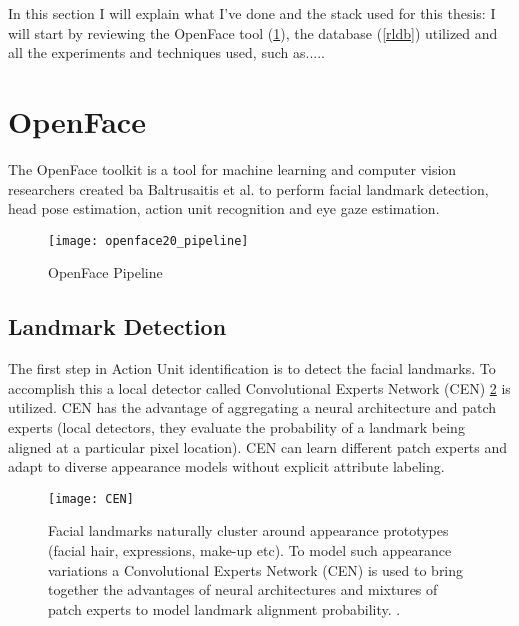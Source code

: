 In this section I will explain what I've done and the stack used for this thesis: I will start by reviewing the OpenFace tool (\ref{OpenFace}), the database (\ref{rldb}) utilized and all the experiments and techniques used, such as.....


\section{OpenFace} \label{OpenFace}
The OpenFace \cite{Baltru2018} toolkit is a tool for machine learning and computer vision researchers created ba Baltrusaitis et al. to perform facial landmark detection, head pose estimation, action unit recognition and eye gaze estimation. \\

\begin{figure}[H]
	\centering
	\texttt{[image: openface20\_pipeline]}
	\caption{OpenFace Pipeline \cite{Baltru2018}}
	\label{fig:openface20_pipeline}
\end{figure}

\subsection{Landmark Detection}
The first step in Action Unit identification is to detect the facial landmarks. To accomplish this a local detector called Convolutional Experts Network (CEN) \ref{fig:CEN} is utilized. CEN has the advantage of aggregating a neural architecture and patch experts (local detectors, they evaluate the probability of a landmark being aligned at a particular pixel location). CEN can learn different patch experts and adapt to diverse appearance models without explicit attribute labeling. \\

\begin{figure}[H]
	\centering
	\texttt{[image: CEN]}
	\caption{Facial landmarks naturally cluster around appearance prototypes (facial hair, expressions, make-up etc). To model such appearance variations a Convolutional Experts Network (CEN) is used to bring together the advantages of neural architectures and mixtures of patch experts to model landmark alignment probability. \cite{Baltru2017}.}
	\label{fig:CEN}
\end{figure}

